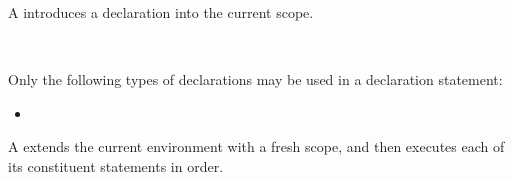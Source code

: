 
\begin{Description}
	A  introduces a declaration into the current scope.
	\end{Description}
	
\begin{Syntax}
	 \\
\end{Syntax}

\begin{Checking}
\end{Checking}
	
Only the following types of declarations may be used in a declaration statement:

\begin{itemize}
\item {}
\end{itemize}


\begin{Description}
A  extends the current environment with a fresh scope,
and then executes each of its constituent statements in order.
\end{Description}

\begin{Syntax}
	 \\
		\lcurly {}\SynStar \rcurly
\end{Syntax}


\begin{Checking}



\end{Checking}

